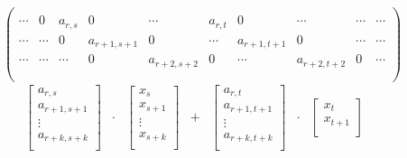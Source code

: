       \begin{figure}[ht]
        \centering
        $$
        \begin{pmatrix}
          \\
          \cdots & 0 & a_{r,s} & 0 & \cdots & a_{r,t} & 0 & \cdots & \cdots & \cdots \\
          \cdots & \cdots & 0 & a_{r+1,s+1} & 0 & \cdots & a_{r+1,t+1} & 0 & \cdots & \cdots \\
          \cdots & \cdots & \cdots & 0 & a_{r+2,s+2} & 0 & \cdots & a_{r+2,t+2} & 0 & \cdots \\
          \\
        \end{pmatrix}
        $$
        $$
        \begin{matrix}
          \begin{bmatrix}
            a_{r,s}     \\
            a_{r+1,s+1} \\
               \vdots   \\
            a_{r+k,s+k} \\
          \end{bmatrix} & \cdot & \begin{bmatrix}
                                    x_s      \\
                                    x_{s+1}  \\
                                      \vdots \\
                                    x_{s+k}  \\
                                  \end{bmatrix} & + & \begin{bmatrix}
                                                      a_{r,t}     \\
                                                      a_{r+1,t+1} \\
                                                        \vdots    \\
                                                      a_{r+k,t+k} \\
                                                      \end{bmatrix} & \cdot & \begin{bmatrix}
                                                                                x_t \\
                                                                                x_{t+1} \\

\end{bmatrix}
\end{matrix}$$
\end{figure}
